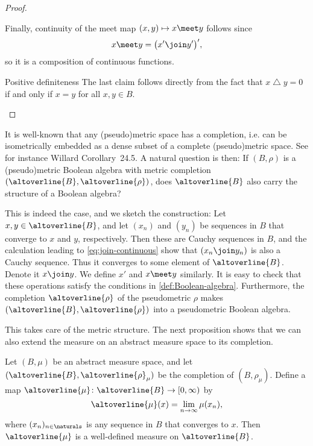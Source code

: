 \documentclass[article, a4paper, 11pt, oneside]{memoir}
\numberwithin{equation}{chapter}
\renewcommand{\symdiff}{\mathbin{\triangle}}
\begin{document}
\begin{proof}
\begin{proofsec}
    Finally, continuity of the meet map $(x,y) \mapsto x \meet y$ follows since
    \begin{equation*}
        x \meet y
            = \bigl( x' \join y' \bigr)',
    \end{equation*}
    so it is a composition of continuous functions.

    \item[Positive definiteness]
    The last claim follows directly from the fact that $x \symdiff y = 0$ if and only if $x = y$ for all $x,y \in B$.
\end{proofsec}
\end{proof}


It is well-known that any (pseudo)metric space has a completion, i.e. can be isometrically embedded as a dense subset of a complete (pseudo)metric space. See for instance Willard Corollary~24.5. A natural question is then: If $(B,\rho)$ is a (pseudo)metric Boolean algebra with metric completion $(\altoverline{B}, \altoverline{\rho})$, does $\altoverline{B}$ also carry the structure of a Boolean algebra?

This is indeed the case, and we sketch the construction: Let $x,y \in \altoverline{B}$, and let $(x_n)$ and $(y_n)$ be sequences in $B$ that converge to $x$ and $y$, respectively. Then these are Cauchy sequences in $B$, and the calculation leading to \eqref{eq:join-continuous} show that $(x_n \join y_n)$ is also a Cauchy sequence. Thus it converges to some element of $\altoverline{B}$. Denote it $x \join y$. We define $x'$ and $x \meet y$ similarly. It is easy to check that these operations satisfy the conditions in \cref{def:Boolean-algebra}. Furthermore, the completion $\altoverline{\rho}$ of the pseudometric $\rho$ makes $(\altoverline{B}, \altoverline{\rho})$ into a pseudometric Boolean algebra.

This takes care of the metric structure. The next proposition shows that we can also extend the measure on an abstract measure space to its completion.

\begin{proposition}
    Let $(B,\mu)$ be an abstract measure space, and let $(\altoverline{B}, \altoverline{\rho}_\mu)$ be the completion of $(B,\rho_\mu)$. Define a map $\altoverline{\mu} \colon \altoverline{B} \to [0,\infty)$ by
    \begin{equation}
        \label{eq:mu-overline-def}
        \altoverline{\mu}(x) = \lim_{n\to\infty} \mu(x_n),
    \end{equation}
    where $(x_n)_{n\in\naturals}$ is any sequence in $B$ that converges to $x$. Then $\altoverline{\mu}$ is a well-defined measure on $\altoverline{B}$.
\end{proposition}
\end{document}
